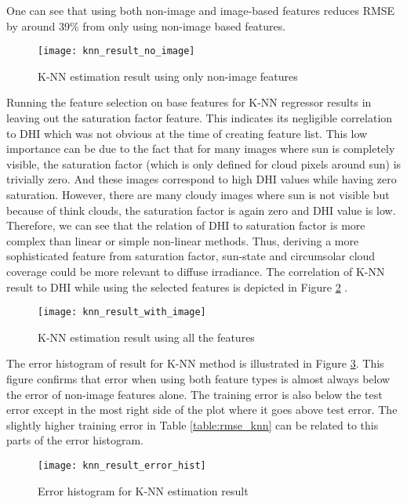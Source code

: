 One can see that using both non-image and image-based features reduces RMSE by around 39\% from only using non-image based features.

\begin{figure}[h!]
\caption{K-NN estimation result using only non-image features}
\label{fig:knn_result_no_image}
\texttt{[image: knn\_result\_no\_image]}
\centering
\end{figure}

Running the feature selection on base features for K-NN regressor results in leaving out the saturation factor feature. This indicates its negligible correlation to DHI which was not obvious at the time of creating feature list. This low importance can be due to the fact that for many images where sun is completely visible, the saturation factor (which is only defined for cloud pixels around sun) is trivially zero. And these images correspond to high DHI values while having zero saturation. However, there are many cloudy images where sun is not visible but because of think clouds, the saturation factor is again zero and DHI value is low. Therefore, we can see that the relation of DHI to saturation factor is more complex than linear or simple non-linear methods. Thus, deriving a more sophisticated feature from saturation factor, sun-state and circumsolar cloud coverage could be more relevant to diffuse irradiance. The correlation of K-NN result to DHI while using the selected features is depicted in Figure \ref{fig:knn_result_all} .

\begin{figure}[h!]
\caption{K-NN estimation result using all the features}
\label{fig:knn_result_all}
\texttt{[image: knn\_result\_with\_image]}
\centering
\end{figure}

The error histogram of result for K-NN method is illustrated in Figure \ref{fig:err_hist_knn}. This figure confirms that error when using both feature types is almost always below the error of non-image features alone. The training error is also below the test error except in the most right side of the plot where it goes above test error. The slightly higher training error in Table \ref{table:rmse_knn} can be related to this parts of the error histogram.

\begin{figure}[h!]
\caption{Error histogram for K-NN estimation result}
\label{fig:err_hist_knn}
\texttt{[image: knn\_result\_error\_hist]}
\centering
\end{figure}

